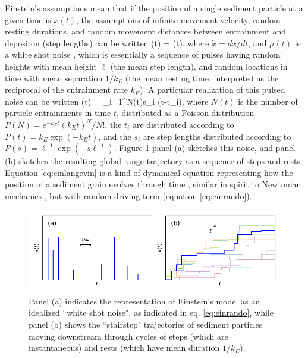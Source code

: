 Einstein's assumptions mean that if the position of a single sediment particle at a given time is $x(t)$, the assumptions of infinite movement velocity, random resting durations, and random movement distances between entrainment and depositon (step lengths) can be written
\be {}(t) = \mu(t), \label{eq:einlangevin}\ee
where $\dot{x} = dx/dt$, and $\mu(t)$ is a white shot noise \citep{VanDenBroeck1983}, which is essentially a sequence of pulses having random heights with mean height $\ell$ (the mean step length), and random locations in time with mean separation $1/k_E$ (the mean resting time, interpreted as the reciprocal of the entrainment rate $k_E$).
A particular realization of this pulsed noise can be written
\be \mu(t) = \sum_{i=1}^{N(t)}s_i \delta(t-t_i), \label{eq:einrando} \ee
where $N(t)$ is the number of particle entrainments in time $t$, distributed as a Poisson distribution $P(N) = e^{-k_E t} (k_E t)^N/N!$, the $t_i$ are distributed according to $P(t) = k_E\exp(-k_E t)$, and the $s_i$ are step lengths distributed according to $P(s) = \ell^{-1}\exp(-s \ell^{-1}).$
Figure \ref{fig:einsteinfig} panel (a) sketches this noise, and panel (b) sketches the resulting global range trajectory as a sequence of steps and rests.
Equation \ref{eq:einlangevin} is a kind of dynamical equation representing how the position of a sediment grain evolves through time \citep{Kubo1978}, similar in spirit to Newtonian mechanics \citep{Goldstein1997}, but with random driving term (equation \ref{eq:einrando}).
\begin{figure}[!htbp]
	\includegraphics[width=\linewidth,keepaspectratio]{./figures/ch1/einsteinConcept.pdf}
	\caption{Panel (a) indicates the representation of Einstein's model as an idealized ``white shot noise", as indicated in eq. \ref{eq:einrando}, while panel (b) shows the ``stairstep" trajectories of sediment particles moving downstream through cycles of steps (which are instantaneous) and rests (which have mean duration $1/k_E$). }
	\label{fig:einsteinfig}
\end{figure}

